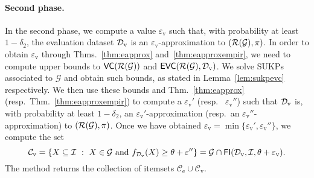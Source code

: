 \paragraph{Second phase.} In the second phase, we compute a value
$\varepsilon_\mathrm{v}$ such that, with probability at least $1-\delta_2$, the
evaluation dataset ${\cal D}_\mathrm{v}$ is an $\varepsilon_\mathrm{v}$-approximation
to $(\mathcal{R}(\mathcal{G}),\pi)$. In
order to obtain $\varepsilon_\mathrm{v}$ through
Thms.~\ref{thm:eapprox} and~\ref{thm:eapproxempir}, we need to compute upper
bounds to $\mathsf{VC}(\mathcal{R}(\mathcal{G}))$ and
$\mathsf{EVC}(\mathcal{R}(\mathcal{G}),{\cal D}_\mathrm{v})$. We solve SUKPs associated to
$\mathcal{G}$ and obtain such bounds, as stated in Lemma~\ref{lem:sukpevc}
respectively. We then use these bounds and Thm.~\ref{thm:eapprox}
(resp.~Thm.~\ref{thm:eapproxempir}) to compute a
$\varepsilon_\mathrm{v}'$ (resp.~ $\varepsilon_\mathrm{v}''$) such that
${\cal D}_\mathrm{v}$ is, with probability at least $1-\delta_2$, an
$\varepsilon_\mathrm{v}'$-approximation (resp.~an
$\varepsilon_\mathrm{v}''$-approximation) to $(\mathcal{R}(\mathcal{G}),\pi)$. Once
we have obtained
$\varepsilon_\mathrm{v}=\min\{\varepsilon_\mathrm{v}',\varepsilon_\mathrm{v}''\}$,
we compute the set
\[
\mathcal{C}_\mathrm{v}=\{X\subseteq{\cal I} ~:~ X\in\mathcal{G} \mbox{ and }
f_{{\cal D}_\mathrm{v}}(X)\ge\theta+\varepsilon''\}=\mathcal{G}\cap\mathsf{FI}({\cal D}_\mathrm{v},{\cal I},\theta+\varepsilon_\mathrm{v}).\]
The method returns the collection of itemsets $\mathcal{C}_\mathrm{e}\cup\mathcal{C}_\mathrm{v}$.

